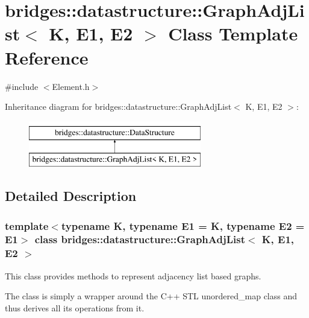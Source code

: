 \hypertarget{classbridges_1_1datastructure_1_1_graph_adj_list}{}\section{bridges\+:\+:datastructure\+:\+:Graph\+Adj\+List$<$ K, E1, E2 $>$ Class Template Reference}
\label{classbridges_1_1datastructure_1_1_graph_adj_list}


{\ttfamily \#include $<$Element.\+h$>$}

Inheritance diagram for bridges\+:\+:datastructure\+:\+:Graph\+Adj\+List$<$ K, E1, E2 $>$\+:\begin{figure}[H]
\begin{center}
\leavevmode
\includegraphics[height=2.000000cm]{classbridges_1_1datastructure_1_1_graph_adj_list}
\end{center}
\end{figure}


\subsection{Detailed Description}
\subsubsection*{template$<$typename K, typename E1 = K, typename E2 = E1$>$\newline
class bridges\+::datastructure\+::\+Graph\+Adj\+List$<$ K, E1, E2 $>$}

This class provides methods to represent adjacency list based graphs. 

The class is simply a wrapper around the C++ S\+TL unordered\+\_\+map class and thus derives all its operations from it.


